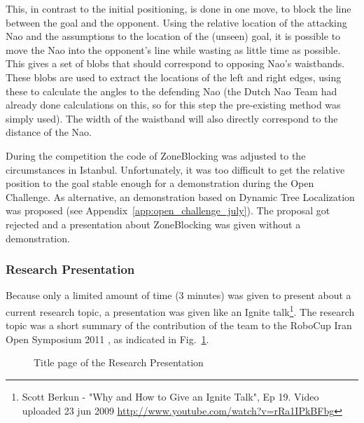 \documentclass[11pt,a4paper,oneside]{article}
\begin{document}
This, in contrast to the initial positioning, is done in one move, to block the line between the goal and the opponent. Using the relative location of the attacking Nao and the assumptions to the location of the (unseen) goal, it is possible to move the Nao into the opponent's line while wasting as little time as possible. This gives a set of blobs that should correspond to opposing Nao’s waistbands. These blobs are used to extract the locations of the left and right edges, using these to calculate the angles to the defending Nao (the Dutch Nao Team had already done calculations on this, so for this step the pre-existing method was simply used). The width of the waistband will also directly correspond to the distance of the Nao. 

During the competition the code of ZoneBlocking was adjusted to the circumstances in Istanbul. Unfortunately, it was too difficult to get the relative position to the goal stable enough for a demonstration during the Open Challenge. As alternative, an demonstration based on Dynamic Tree Localization was proposed (see Appendix~\ref{app:open_challenge_july}). The proposal got rejected and a presentation about ZoneBlocking was given without a demonstration.

\subsubsection{Research Presentation}
Because only a limited amount of time (3 minutes) was given to present about a current research topic, a presentation was given like an Ignite talk\footnote{Scott Berkun - "Why and How to Give an Ignite Talk", Ep 19. Video uploaded 23 jun 2009 \url{http://www.youtube.com/watch?v=rRa1IPkBFbg}}. 
The research topic was a short summary of the contribution of the team to the RoboCup Iran Open Symposium 2011 \cite{Visser2011rios}, as indicated in Fig.~\ref{fig:TitlePresentation}.

\begin{figure}[htb]
\centering
{}
\caption{Title page of the Research Presentation}
\label{fig:TitlePresentation}
\end{figure}
\end{document}
